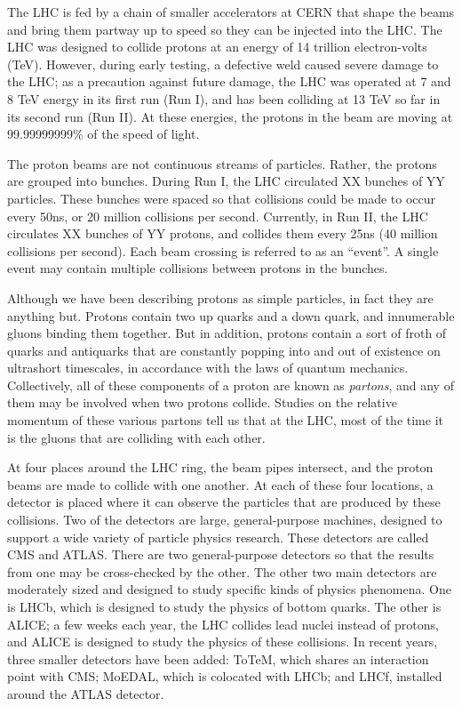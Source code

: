
The LHC is fed by a chain of smaller accelerators at CERN that shape
the beams and bring them partway up to speed so they can be injected
into the LHC. The LHC was designed to collide protons at an energy of
14 trillion electron-volts (TeV). However, during early testing, a
defective weld caused severe damage to the LHC; as a precaution
against future damage, the LHC was operated at 7 and 8 TeV energy in
its first run (Run I), and has been colliding at 13 TeV so far in its
second run (Run II). At these energies, the protons in the beam are
moving at 99.99999999\% of the speed of light.

The proton beams are not continuous streams of particles. Rather, the
protons are grouped into bunches. During Run I, the LHC circulated XX
bunches of YY particles. These bunches were spaced so that collisions
could be made to occur every 50ns, or 20 million collisions per
second. Currently, in Run II, the LHC circulates XX bunches of YY protons, and
collides them every 25ns (40 million collisions per second). %
Each beam crossing is referred to as an ``event''. A single event may
contain multiple collisions between protons in the bunches. %


Although we have been describing protons as simple particles, in fact
they are anything but. Protons contain two up quarks and a down quark,
and innumerable gluons binding them together. But in addition, protons
contain a sort of froth of quarks and antiquarks that are constantly
popping into and out of existence on ultrashort timescales, in
accordance with the laws of quantum mechanics. Collectively, all of
these components of a proton are known as \emph{partons}, and any of
them may be involved when two protons collide. Studies on the relative
momentum of these various partons tell us that at the LHC, most of the
time it is the gluons that are colliding with each other. %

At four places around the LHC ring, the beam pipes intersect, and the
proton beams are made to collide with one another. At each of these
four locations, a detector is placed where it can observe the
particles that are produced by these collisions. Two of
the detectors are large, general-purpose machines, designed to support
a wide variety of particle physics research. These detectors are called CMS
and ATLAS. There are two general-purpose detectors so that the results from one
may be cross-checked by the other. The other two main
detectors are moderately sized and designed to study specific kinds of physics
phenomena. One is LHCb, which is designed to study the physics of
bottom quarks. The other is ALICE; a few weeks each year, the LHC
collides lead nuclei instead of protons, and ALICE is designed to
study the physics of these collisions. In recent years, three smaller detectors have
been added: ToTeM, which shares an interaction point with CMS; MoEDAL,
which is colocated with LHCb; and LHCf, installed around the ATLAS detector.

